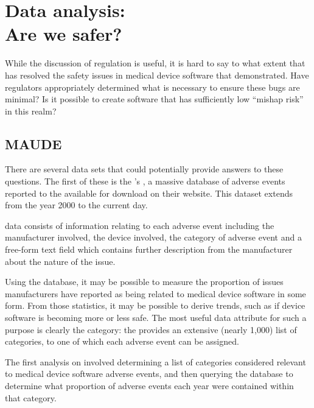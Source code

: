 \documentclass{cshonours}
\begin{document}
{\chapter{Data analysis:\\Are we safer?}
\label{chap:data}
While the discussion of regulation is useful, it is hard to say to what extent that has resolved the safety issues in medical device software that \ther demonstrated. Have regulators appropriately determined what is necessary to ensure these bugs are minimal? Is it possible to create software that has sufficiently low ``mishap risk'' in this realm?

\section{MAUDE}
There are several data sets that could potentially provide answers to these questions. The first of these is the \fda's \maude, a massive database of adverse events reported to the \fda available for download on their website. This dataset extends from the year 2000 to the current day.

\maude data consists of information relating to each adverse event including the manufacturer involved, the device involved, the category of adverse event and a free-form text field which contains further description from the manufacturer about the nature of the issue.

Using the \maude database, it may be possible to measure the proportion of issues manufacturers have reported as being related to medical device software in some form. From those statistics, it may be possible to derive trends, such as if device software is becoming more or less safe. The most useful data attribute for such a purpose is clearly the category: the \fda provides an extensive (nearly 1,000) list of categories, to one of which each adverse event can be assigned.

The first analysis on \maude involved determining a list of categories considered relevant to medical device software adverse events, and then querying the database to determine what proportion of adverse events each year were contained within that category. 

}
\end{document}
